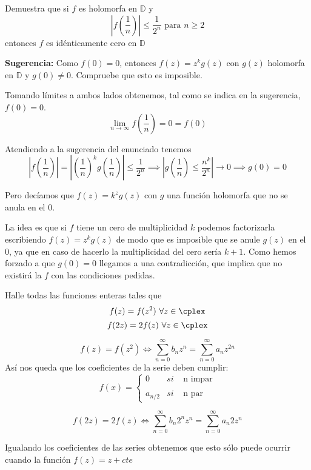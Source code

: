 \begin{problem}[3]
Demuestra que si $f$ es holomorfa en $\mathbb{D}$ y
\[\left| f\left( \frac{1}{n}\right) \right|\leq \frac{1}{2^n} \text{ para } n\geq2\]
entonces $f$ es idénticamente cero en $\mathbb{D}$

\textbf{Sugerencia:} Como $f(0)=0$, entonces $f(z)=z^kg(z)$ con $g(z)$ holomorfa en $\mathbb{D}$ y $g(0)\neq 0$. Compruebe que esto es imposible.

\solution
{}

Tomando límites a ambos lados obtenemos, tal como se indica en la sugerencia, $f(0)=0$.
\[\lim_{n \to \infty} f\left(\frac{1}{n}\right) = 0=f(0)\]

Atendiendo a la sugerencia del enunciado tenemos
\[\left|f\left( \frac{1}{n}\right) \right| = \left| \left(\frac{1}{n}\right)^kg\left( \frac{1}{n}\right)\right|\leq \frac{1}{2^n} \implies \left| g\left( \frac{1}{n}\right) \leq \frac{n^k}{2^n}\right| \to 0 \implies g(0)=0\]

Pero decíamos que $f(z)=k^zg(z)$ con $g$ una función holomorfa que no se anula en el 0.


\obs La idea es que si $f$ tiene un cero de multiplicidad $k$ podemos factorizarla escribiendo $f(z)=z^kg(z)$ de modo que es imposible que se anule $g(z)$ en el 0, ya que en caso de hacerlo la multiplicidad del cero sería $k+1$. Como hemos forzado a que $g(0)=0$ llegamos a una contradicción, que implica que no existirá la $f$ con las condiciones pedidas.

\end{problem}

\begin{problem}[4]
Halle todas las funciones enteras tales que
\ppart
\[f(z)=f(z^2) \ \forall z \in \cplex\]
\ppart
\[f(2z)=2f(z) \ \forall z \in \cplex\]

\solution
\spart
\[f(z)=f(z^2) \iff \sum_{n=0}^{\infty}b_nz^{n} = \sum_{n=0}^{\infty}a_nz^{2n}\]
Así nos queda que los coeficientes de la serie deben cumplir:
\[f(x)= \left\{ \begin{array}{lcc}
             0 &   si  & \text{ n impar} \\
             \\ a_{n/2} &  si  & \text{ n par}
             \end{array}
   \right.\]

\spart
{}

\[f(2z)=2f(z) \iff \sum_{n=0}^{\infty} b_n2^nz^n = \sum_{n=0}^{\infty}a_n2z^n\]

Igualando los coeficientes de las series obtenemos que esto sólo puede ocurrir cuando la función $f(z)=z+cte$

\end{problem}

